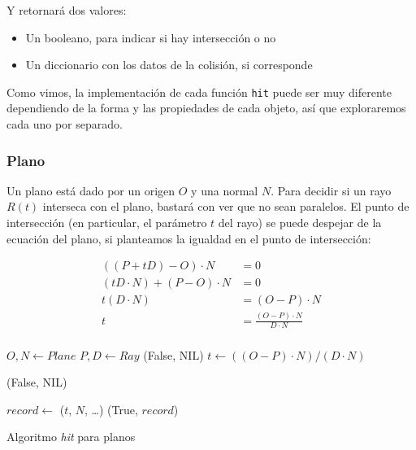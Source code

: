 Y retornará dos valores:

\begin{itemize}
  \item Un booleano, para indicar si hay intersección o no
  \item Un diccionario con los datos de la colisión, si corresponde
\end{itemize}

Como vimos, la implementación de cada función \texttt{hit} puede ser muy
diferente dependiendo de la forma y las propiedades de cada objeto, así que
exploraremos cada uno por separado.

\subsubsection{Plano}

Un plano está dado por un origen $O$ y una normal $N$. Para decidir si un rayo
$R(t)$ interseca con el plano, bastará con ver que no sean paralelos. El punto
de intersección (en particular, el parámetro $t$ del rayo) se puede despejar de
la ecuación del plano, si planteamos la igualdad en el punto de intersección:

\begin{align*}
  ((P + tD) - O) \cdot N         & = 0                                 \\
  (tD \cdot N) + (P - O) \cdot N & = 0                                 \\
  t(D \cdot N)                   & = (O - P) \cdot N                   \\
  t                              & = \frac{(O - P) \cdot N}{D \cdot N} \\
\end{align*}

\begin{algorithm}[H]
  \begin{algorithmic}[1]
    \State $O, N \gets Plane$ 
    \State $P, D \gets Ray$ 
     
    \State \Return (False, NIL)
    \EndIf
    \State $t \gets ((O - P) \cdot N)/(D \cdot N)$

     
    \State \Return (False, NIL)
    \EndIf

    \State $record \gets$ ($t$, $N$, \dots) 
    \State \Return (True, $record$)
    \EndFunction
  \end{algorithmic}
  \caption{Algoritmo \textit{hit} para planos}
  \label{alg:plane-hit}
\end{algorithm}

